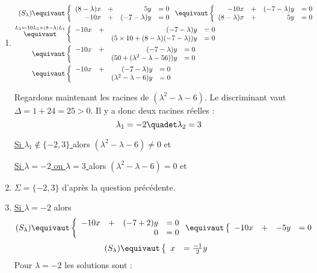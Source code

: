 \documentclass[a4paper, 11pt,reqno]{article}
\begin{document}
\begin{correction}
\begin{enumerate}
\item \begin{align*}
(S_\lambda)\equivaut &\left\{\begin{array}{rcrl}
(8-\lambda)x &+&5y&=0\\
-10x&+&(-7-\lambda)y&=0
\end{array}\right.
\equivaut \left\{\begin{array}{rcrl}
-10x&+&(-7-\lambda)y&=0\\
(8-\lambda)x &+&5y&=0
\end{array}\right.\\
\overset{L_2\leftarrow 10L_2+(8-\lambda)L_1}{\equivaut} &\left\{\begin{array}{rcrl}
-10x&+&(-7-\lambda)y&=0\\
& &(5\times 10+(8-\lambda)(-7-\lambda))y&=0
\end{array}\right.
\\
\equivaut &\left\{\begin{array}{rcrl}
-10x&+&(-7-\lambda)y&=0\\
& &(50+(\lambda^2-\lambda -56))y&=0
\end{array}\right.
\\
\equivaut &\left\{\begin{array}{rcrl}
-10x&+&(-7-\lambda)y&=0\\
& &(\lambda^2-\lambda -6)y&=0
\end{array}\right.
\end{align*}

Regardons maintenant les racines de $(\lambda^2-\lambda -6)$. Le discriminant vaut $\Delta = 1+24=25>0$. Il y a donc deux racines réelles : 
$$\lambda_1 =-2\quadet \lambda_2=3$$

\underline{Si $\lambda_1 \notin \{-2,3\}$ }
alors $(\lambda^2-\lambda -6)\neq 0$ et 

\underline{Si $\lambda=-2$ ou  $\lambda=3$ }
alors $(\lambda^2-\lambda -6)=0$ et 

\item $\Sigma =\{ -2,3\}$ d'après la question précédente. 

\item \underline{Si $\lambda =-2$} alors 
$$(S_\lambda)\equivaut \left\{\begin{array}{rcrl}
-10x&+&(-7+2)y&=0\\
& &0&=0
\end{array}\right.\equivaut \left\{\begin{array}{rcrl}
-10x&+&-5y&=0
\end{array}\right.
$$
$$(S_\lambda)\equivaut\left\{\begin{array}{rl}
x&=\frac{-1}{2}y
\end{array}\right.
$$
Pour $\lambda=-2$ les solutions sont :



\end{enumerate}
\end{correction}
\end{document}
